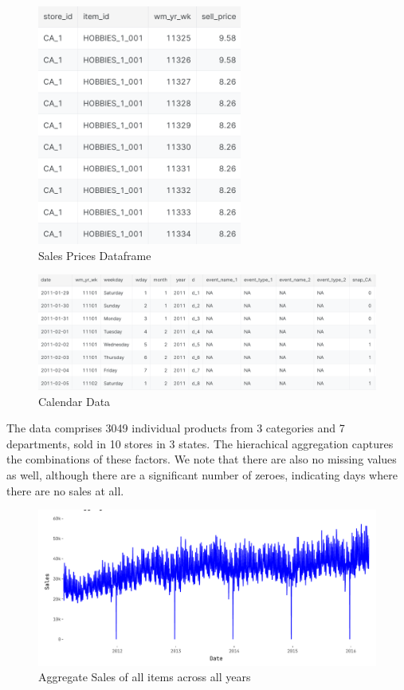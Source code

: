 \documentclass[12pt]{article}
\begin{document}
\begin{figure}[H]
    \centering
    \includegraphics[width=0.6\textwidth]{Images/salesdata.png}
    \caption{Sales Prices Dataframe}
    \label{fig:6-salesdata}
\end{figure} 

\begin{figure}[H]
    \centering
    \includegraphics[width=\textwidth]{Images/calendar.png}
    \caption{Calendar Data}
    \label{fig:6-calendardata}
\end{figure} 

\noindent The data comprises 3049 individual products from 3 categories and 7 departments, sold in 10 stores in 3 states. The hierachical aggregation captures the combinations of these factors. We note that there are also no missing values as well, although there are a significant number of zeroes, indicating days where there are no sales at all. 

\begin{figure}[H]
    \centering
    \includegraphics[width=\textwidth]{Images/timeseriessales.png}
    \caption{Aggregate Sales of all items across all years}
    \label{fig:aggregatesales}
\end{figure} 
\end{document}
